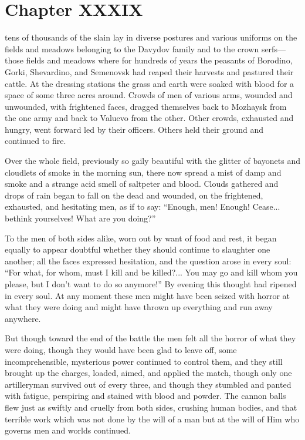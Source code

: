 \chapter*{Chapter XXXIX} \ifaudio {}
\fi

 tens of thousands of the slain lay in diverse postures
and various uniforms on the fields and meadows belonging to the
Davydov family and to the crown serfs---those fields and meadows
where for hundreds of years the peasants of Borodino, Gorki,
Shevardino, and Semenovsk had reaped their harvests and pastured
their cattle. At the dressing stations the grass and earth were
soaked with blood for a space of some three acres around. Crowds
of men of various arms, wounded and unwounded, with frightened
faces, dragged themselves back to Mozhaysk from the one army and
back to Valuevo from the other. Other crowds, exhausted and
hungry, went forward led by their officers. Others held their
ground and continued to fire.

Over the whole field, previously so gaily beautiful with the
glitter of bayonets and cloudlets of smoke in the morning sun,
there now spread a mist of damp and smoke and a strange acid
smell of saltpeter and blood.  Clouds gathered and drops of rain
began to fall on the dead and wounded, on the frightened,
exhausted, and hesitating men, as if to say: ``Enough, men!
Enough! Cease... bethink yourselves! What are you doing?''

To the men of both sides alike, worn out by want of food and
rest, it began equally to appear doubtful whether they should
continue to slaughter one another; all the faces expressed
hesitation, and the question arose in every soul: ``For what, for
whom, must I kill and be killed?... You may go and kill whom you
please, but I don't want to do so anymore!'' By evening this
thought had ripened in every soul. At any moment these men might
have been seized with horror at what they were doing and might
have thrown up everything and run away anywhere.

But though toward the end of the battle the men felt all the
horror of what they were doing, though they would have been glad
to leave off, some incomprehensible, mysterious power continued
to control them, and they still brought up the charges, loaded,
aimed, and applied the match, though only one artilleryman
survived out of every three, and though they stumbled and panted
with fatigue, perspiring and stained with blood and powder. The
cannon balls flew just as swiftly and cruelly from both sides,
crushing human bodies, and that terrible work which was not done
by the will of a man but at the will of Him who governs men and
worlds continued.

